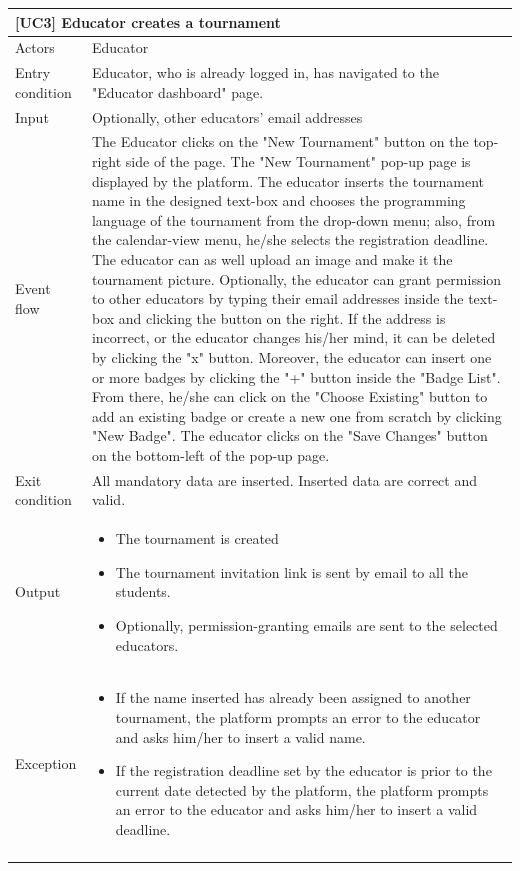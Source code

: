 \documentclass[12pt,oneside,a4paper]{article}
\begin{document}
\begin{table}[htbp]
\begin{tabular}{|l|p{12cm}|}
    \hline
    \multicolumn{2}{|l|}{\textbf{[UC3] Educator creates a tournament}}\\
    \hline
    Actors & Educator\\
    \hline
    Entry condition & Educator, who is already logged in, has navigated to the "Educator dashboard" page.\\
    \hline
    Input & Optionally, other educators' email addresses\\
    \hline
    Event flow &  The Educator clicks on the "New Tournament" button on the top-right side of the page. The "New Tournament" pop-up page is displayed by the platform. The educator inserts the tournament name in the designed text-box and chooses the programming language of the tournament from the drop-down menu; also, from the calendar-view menu, he/she selects the registration deadline. The educator can as well upload an image and make it the tournament picture. Optionally, the educator can grant permission to other educators by typing their email addresses inside the text-box and clicking the button on the right. If the address is incorrect, or the educator changes his/her mind, it can be deleted by clicking the "x" button. Moreover, the educator can insert one or more badges by clicking the "+" button inside the "Badge List". From there, he/she can click on the "Choose Existing" button to add an existing badge or create a new one from scratch by clicking "New Badge". The educator clicks on the "Save Changes" button on the bottom-left of the pop-up page. \\
    \hline
    Exit condition & All mandatory data are inserted. Inserted data are correct and valid.\\
    \hline
    Output & \begin{itemize}
        \item The tournament is created
        \item The tournament invitation link is sent by email to all the students.
        \item Optionally, permission-granting emails are sent to the selected educators.
    \end{itemize}\\
    \hline
    Exception & \begin{itemize}
        \item If the name inserted has already been assigned to another tournament, the platform prompts an error to the educator and asks him/her to insert a valid name.
        \item If the registration deadline set by the educator is prior to the current date detected by the platform, the platform prompts an error to the educator and asks him/her to insert a valid deadline.
    \end{itemize}\\
    \lasthline
\end{tabular}
\end{table}
\end{document}
